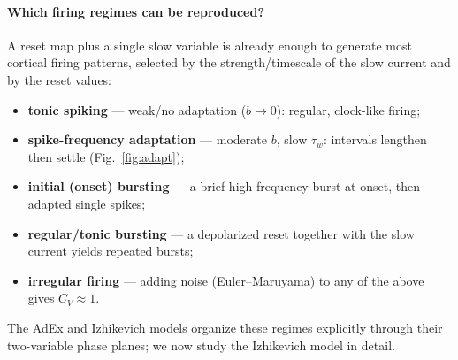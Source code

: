 \documentclass[11pt]{article}
\begin{document}
\paragraph{Which firing regimes can be reproduced?} A reset map plus a single slow variable is
already enough to generate most cortical firing patterns, selected by the strength/timescale of the
slow current and by the reset values:
\begin{itemize}[leftmargin=1.5em]
  \item \textbf{tonic spiking} --- weak/no adaptation ($b\to0$): regular, clock-like firing;
  \item \textbf{spike-frequency adaptation} --- moderate $b$, slow $\tau_w$: intervals lengthen then settle (Fig.~\ref{fig:adapt});
  \item \textbf{initial (onset) bursting} --- a brief high-frequency burst at onset, then adapted single spikes;
  \item \textbf{regular/tonic bursting} --- a depolarized reset together with the slow current yields repeated bursts;
  \item \textbf{irregular firing} --- adding noise (Euler--Maruyama) to any of the above gives $C_V\approx1$.
\end{itemize}
The AdEx and Izhikevich models organize these regimes explicitly through their two-variable phase
planes; we now study the Izhikevich model in detail.
\end{document}

